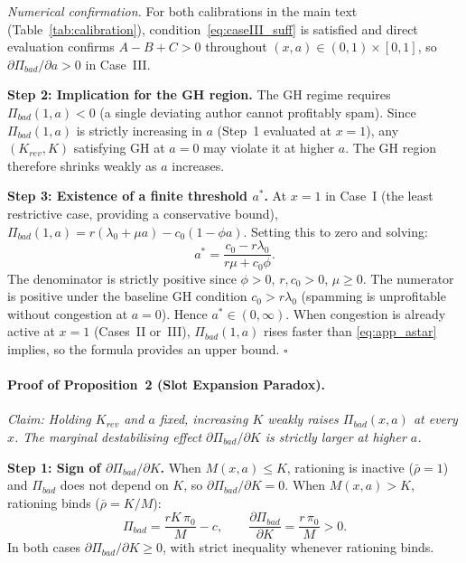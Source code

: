 \documentclass{article}
\begin{document}
\medskip
\noindent\textit{Numerical confirmation.}
For both calibrations in the main text (Table~\ref{tab:calibration}), condition~\eqref{eq:caseIII_suff} is satisfied and direct evaluation confirms $A - B + C > 0$ throughout $(x,a)\in(0,1)\times[0,1]$, so $\partial\Pi_{\mathit{bad}}/\partial a>0$ in Case~III.

\noindent\textbf{Step 2: Implication for the GH region.}
The GH regime requires $\Pi_{\mathit{bad}}(1,a) < 0$ (a single deviating author cannot profitably spam).
Since $\Pi_{\mathit{bad}}(1,a)$ is strictly increasing in $a$ (Step~1 evaluated at $x=1$), any $(K_{\mathit{rev}},K)$ satisfying GH at $a=0$ may violate it at higher $a$.
The GH region therefore shrinks weakly as $a$ increases.

\noindent\textbf{Step 3: Existence of a finite threshold $a^*$.}
At $x=1$ in Case~I (the least restrictive case, providing a conservative bound), $\Pi_{\mathit{bad}}(1,a) = r(\lambda_0+\mu a) - c_0(1-\phi a)$.
Setting this to zero and solving:
\begin{equation}
  \label{eq:app_astar}
  a^* = \frac{c_0 - r\lambda_0}{r\mu + c_0\phi}.
\end{equation}
The denominator is strictly positive since $\phi > 0$, $r, c_0 > 0$, $\mu \geq 0$.
The numerator is positive under the baseline GH condition $c_0 > r\lambda_0$ (spamming is unprofitable without congestion at $a=0$).
Hence $a^* \in (0,\infty)$.
When congestion is already active at $x=1$ (Cases~II or~III), $\Pi_{\mathit{bad}}(1,a)$ rises faster than \eqref{eq:app_astar} implies, so the formula provides an upper bound.
\hfill$\square$

\bigskip

\paragraph{Proof of Proposition~2 (Slot Expansion Paradox).}

\noindent\textit{Claim: Holding $K_{\mathit{rev}}$ and $a$ fixed, increasing $K$ weakly raises $\Pi_{\mathit{bad}}(x,a)$ at every $x$.
The marginal destabilising effect $\partial\Pi_{\mathit{bad}}/\partial K$ is strictly larger at higher $a$.}

\medskip\noindent\textbf{Step 1: Sign of $\partial\Pi_{\mathit{bad}}/\partial K$.}
When $M(x,a) \leq K$, rationing is inactive ($\bar\rho=1$) and $\Pi_{\mathit{bad}}$ does not depend on $K$, so $\partial\Pi_{\mathit{bad}}/\partial K = 0$.
When $M(x,a) > K$, rationing binds ($\bar\rho = K/M$):
\[
  \Pi_{\mathit{bad}} = \frac{rK\,\pi_0}{M} - c, \qquad
  \frac{\partial\Pi_{\mathit{bad}}}{\partial K} = \frac{r\,\pi_0}{M} > 0.
\]
In both cases $\partial\Pi_{\mathit{bad}}/\partial K \geq 0$, with strict inequality whenever rationing binds.
\end{document}
